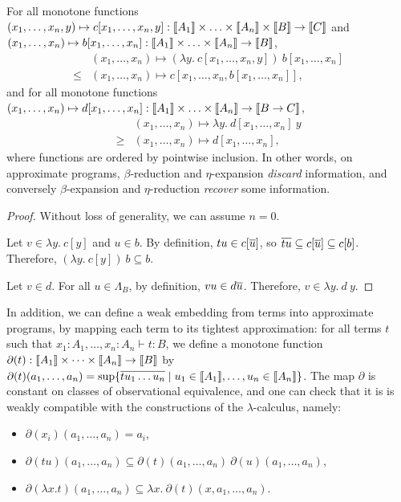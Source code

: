\begin{proposition} \label{prop:intervals-weak-model-lambda} For all monotone functions $(x_1, \ldots, x_n, y) \mapsto c[x_1, \ldots, x_n, y] : \llbracket A_1 \rrbracket \times \ldots \times \llbracket A_n \rrbracket \times  \llbracket B \rrbracket \to \llbracket C \rrbracket$ and $(x_1, \ldots, x_n) \mapsto b[x_1, \ldots, x_n] : \llbracket A_1 \rrbracket \times \ldots \times \llbracket A_n \rrbracket \to \llbracket B \rrbracket$, $$\begin{array}{ll} & (x_1, \ldots, x_n) \mapsto (\lambda y.~  c[x_1, \ldots, x_n, y])~ b[x_1, \ldots, x_n] \\ \leq & (x_1, \ldots, x_n) \mapsto c[x_1, \ldots, x_n, b[x_1, \ldots, x_n]]\text{,}\end{array}$$
and for all monotone functions $(x_1, \ldots, x_n) \mapsto d[x_1, \ldots, x_n] : \llbracket A_1 \rrbracket \times \ldots \times \llbracket A_n \rrbracket \to  \llbracket B \to C \rrbracket$,
$$\begin{array}{ll} & (x_1, \ldots, x_n) \mapsto \lambda y.~  d[x_1, \ldots, x_n]~ y \\ \geq & (x_1, \ldots, x_n) \mapsto d[x_1, \ldots, x_n]\text{,}\end{array}$$
where functions are ordered by pointwise inclusion.  In other words, on approximate programs, $\beta$-reduction and $\eta$-expansion \emph{discard} information, and conversely $\beta$-expansion and $\eta$-reduction \emph{recover} some information.
\end{proposition}

\begin{proof} Without loss of generality, we can assume $n=0$.

Let $v \in \lambda y.~ c[y]$ and $u \in b$. By definition, $tu \in c[\overline{u}]$, so $\overline{tu} \subseteq c[\overline{u}] \subseteq c[b]$. Therefore, $(\lambda y.~ c[y])~ b \subseteq b$.

Let $v \in d$. For all $u \in \Lambda_B$, by definition, $vu \in d\overline{u}$. Therefore, $v \in \lambda y.~ d~ y$.
\end{proof}

In addition, we can define a weak embedding from terms into approximate programs, by mapping each term to its tightest approximation: for all terms $t$ such that $x_{1}:A_{1},\dots,x_{n}:A_{n}\vdash t:B$, we define a monotone function $\partial(t):\llbracket A_{1} \rrbracket\times \dots \times \llbracket A_{n} \rrbracket \to \llbracket B \rrbracket$ by $\partial(t)(a_1, \ldots, a_n) = \sup \{ \overline{t u_1 \ldots u_n} \mid u_1 \in \llbracket A_1 \rrbracket, \ldots, u_n \in \llbracket A_n \rrbracket \}$. The map $\partial$ is constant on classes of observational equivalence, and one can check that it is is weakly compatible with the constructions of the $\lambda$-calculus, namely:
\begin{itemize}
\item $\partial (x_{i})(a_{1},\dots, a_{n})=a_{i}$,
\item $\partial (tu)(a_{1},\dots, a_{n}) \subseteq \partial (t)(a_{1},\dots, a_{n}) ~ \partial (u)(a_{1},\dots, a_{n})$,
\item $\partial (\lambda x. t)(a_{1},\dots, a_{n}) \subseteq \lambda x.~ \partial (t)(x, a_{1},\dots, a_{n})$.
\end{itemize}

